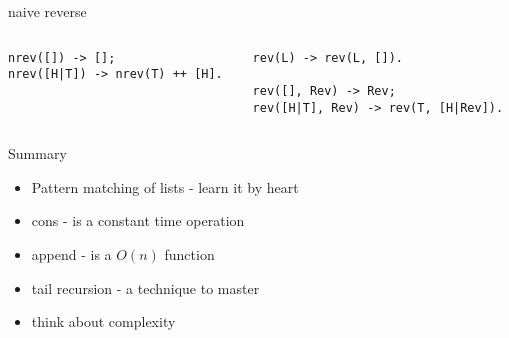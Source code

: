 \begin{frame}[fragile]{naive reverse}

\pause

\begin{columns}
  \begin{column}{0.5\linewidth}
\begin{verbatim}
nrev([]) -> [];
nrev([H|T]) -> nrev(T) ++ [H].
\end{verbatim}
  \end{column}
\pause
  \begin{column}{0.5\linewidth}
\begin{verbatim}
rev(L) -> rev(L, []).

rev([], Rev) -> Rev;
rev([H|T], Rev) -> rev(T, [H|Rev]).
\end{verbatim}
  \end{column}
  \end{columns}  
\end{frame}

\begin{frame}{Summary}

\begin{itemize}
 \pause\item Pattern matching of lists - learn it by heart
 \pause\item cons - is a constant time operation
 \pause\item append - is a $O(n)$ function
 \pause\item tail recursion - a technique to master 
 \pause\item think about complexity
\end{itemize}

\end{frame}





